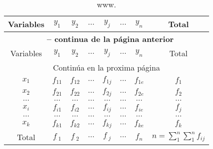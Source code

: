 \documentclass[a4paper]{report}
\begin{document}
\begin{t}
\begin{longtable}{|c|cccccc|c|}
	\caption{www.}
	\label{tab:w}                                                                                                                     \\
	\hline
	Variables & $y_1$           & $y_2$           & $\ldots$ & $y_{j}$         & $\ldots$ & $y_n$    & Total                          \\
	\hline
	\endfirsthead
	\multicolumn{8}{c}{{\bfseries \tablename\ \thetable{} -- continua de la página anterior}}                                         \\
	\hline
	Variables & $y_1$           & $y_2$           & $\ldots$ & $y_{j}$         & $\ldots$ & $y_n$    & Total                          \\
	\hline
	\endhead
	\hline
	\multicolumn{8}{c}{{Continúa en la proxima página}}                                                                               \\
	\hline
	\endfoot
	\hline
	\endlastfoot
	$x_1$     & $f_{11}$        & $f_{12}$        & $\ldots$ & $f_{1j}$        & $\ldots$ & $f_{1e}$ & $f_1$                          \\
	$x_2$     & $f_{21}$        & $f_{22}$        & $\ldots$ & $f_{2j}$        & $\ldots$ & $f_{2e}$ & $f_2$                          \\
	$\ldots$  & $\ldots$        & $\ldots$        & $\ldots$ & $\ldots$        & $\ldots$ & $\ldots$ & $\ldots$                       \\
	$x_i$     & $f_{i1}$        & $f_{i2}$        & $\ldots$ & $f_{ij}$        & $\ldots$ & $f_{ie}$ & $f_j$                          \\
	$\ldots$  & $\ldots$        & $\ldots$        & $\ldots$ & $\ldots$        & $\ldots$ & $\ldots$ & $\ldots$                       \\
	$x_k$     & $f_{k1}$        & $f_{k2}$        & $\ldots$ & $f_{kj}$        & $\ldots$ & $f_{ke}$ & $f_k$                          \\
	\hline
	Total     & $f_{\dot \; 1}$ & $f_{\dot \; 2}$ & $\ldots$ & $f_{\dot \; j}$ & $\ldots$ & $f_n$    & $n=\sum_1^{n}\sum_1^{n}f_{ij}$ \\
\end{longtable}





\end{t}
\end{document}

